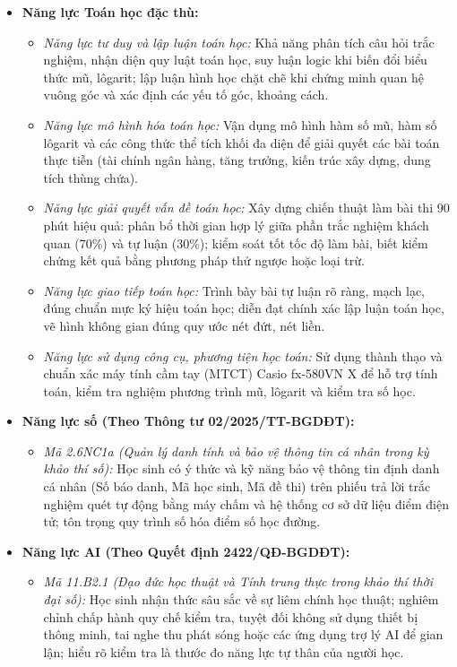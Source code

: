 \documentclass[12pt, a4paper]{article}
\begin{document}
\begin{itemize}[leftmargin=1.2cm]
    \item \textbf{Năng lực Toán học đặc thù:}
    \begin{itemize}[leftmargin=0.6cm]
        \item \textit{Năng lực tư duy và lập luận toán học:} Khả năng phân tích câu hỏi trắc nghiệm, nhận diện quy luật toán học, suy luận logic khi biến đổi biểu thức mũ, lôgarit; lập luận hình học chặt chẽ khi chứng minh quan hệ vuông góc và xác định các yếu tố góc, khoảng cách.
        \item \textit{Năng lực mô hình hóa toán học:} Vận dụng mô hình hàm số mũ, hàm số lôgarit và các công thức thể tích khối đa diện để giải quyết các bài toán thực tiễn (tài chính ngân hàng, tăng trưởng, kiến trúc xây dựng, dung tích thùng chứa).
        \item \textit{Năng lực giải quyết vấn đề toán học:} Xây dựng chiến thuật làm bài thi 90 phút hiệu quả: phân bổ thời gian hợp lý giữa phần trắc nghiệm khách quan (70\%) và tự luận (30\%); kiểm soát tốt tốc độ làm bài, biết kiểm chứng kết quả bằng phương pháp thử ngược hoặc loại trừ.
        \item \textit{Năng lực giao tiếp toán học:} Trình bày bài tự luận rõ ràng, mạch lạc, đúng chuẩn mực ký hiệu toán học; diễn đạt chính xác lập luận toán học, vẽ hình không gian đúng quy ước nét đứt, nét liền.
        \item \textit{Năng lực sử dụng công cụ, phương tiện học toán:} Sử dụng thành thạo và chuẩn xác máy tính cầm tay (MTCT) Casio fx-580VN X để hỗ trợ tính toán, kiểm tra nghiệm phương trình mũ, lôgarit và kiểm tra số học.
    \end{itemize}

    \item \textbf{Năng lực số (Theo Thông tư 02/2025/TT-BGDĐT):}
    \begin{itemize}[leftmargin=0.6cm]
        \item \textit{Mã 2.6NC1a (Quản lý danh tính và bảo vệ thông tin cá nhân trong kỳ khảo thí số):} Học sinh có ý thức và kỹ năng bảo vệ thông tin định danh cá nhân (Số báo danh, Mã học sinh, Mã đề thi) trên phiếu trả lời trắc nghiệm quét tự động bằng máy chấm và hệ thống cơ sở dữ liệu điểm điện tử; tôn trọng quy trình số hóa điểm số học đường.
    \end{itemize}

    \item \textbf{Năng lực AI (Theo Quyết định 2422/QĐ-BGDĐT):}
    \begin{itemize}[leftmargin=0.6cm]
        \item \textit{Mã 11.B2.1 (Đạo đức học thuật và Tính trung thực trong khảo thí thời đại số):} Học sinh nhận thức sâu sắc về sự liêm chính học thuật; nghiêm chỉnh chấp hành quy chế kiểm tra, tuyệt đối không sử dụng thiết bị thông minh, tai nghe thu phát sóng hoặc các ứng dụng trợ lý AI để gian lận; hiểu rõ kiểm tra là thước đo năng lực tự thân của người học.
    \end{itemize}


\end{itemize}
\end{document}
